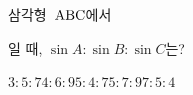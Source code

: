 삼각형~$\mathrm{ABC}$에서 \par\smallskip{}\par\smallskip\noindent 일 때, $\sin A:\sin B:\sin C$는?
\begin{choices32}{$3:5:7$}{$4:6:9$}{$5:4:7$}{$5:7:9$}{$7:5:4$}\end{choices32}
